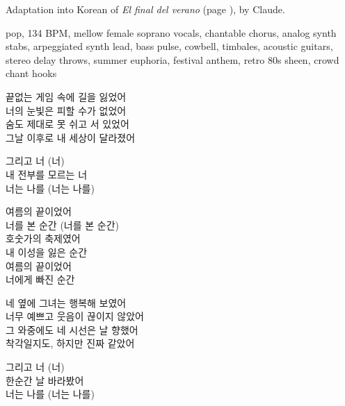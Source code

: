 
\begin{notes}
Adaptation into Korean of \emph{El final del verano} (page \pageref{sec:verano}), by Claude.
\end{notes}
\begin{style}
pop, 134 BPM, mellow female soprano vocals, chantable chorus, analog synth stabs, arpeggiated synth lead, bass pulse, cowbell, timbales, acoustic guitars, stereo delay throws, summer euphoria, festival anthem, retro 80s sheen, crowd chant hooks
\end{style}
\begin{lyrics}
\begin{korean}
끝없는 게임 속에 길을 잃었어\\
너의 눈빛은 피할 수가 없었어\\
숨도 제대로 못 쉬고 서 있었어\\
그날 이후로 내 세상이 달라졌어
\end{korean}

\begin{korean}
그리고 너 (너)\\
내 전부를 모르는 너\\
너는 나를 (너는 나를)
\end{korean}

\begin{korean}
여름의 끝이었어\\
너를 본 순간 (너를 본 순간)\\
호숫가의 축제였어\\
내 이성을 잃은 순간\\
여름의 끝이었어\\
너에게 빠진 순간
\end{korean}

\begin{korean}
네 옆에 그녀는 행복해 보였어\\
너무 예쁘고 웃음이 끊이지 않았어\\
그 와중에도 네 시선은 날 향했어\\
착각일지도, 하지만 진짜 같았어
\end{korean}

\begin{korean}
그리고 너 (너)\\
한순간 날 바라봤어\\
너는 나를 (너는 나를)
\end{korean}


\end{lyrics}
